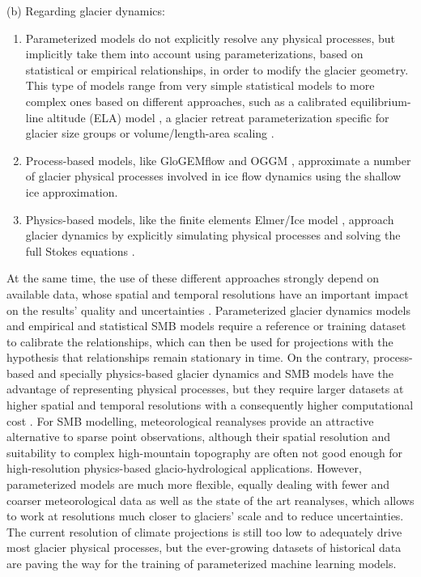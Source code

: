 (b) Regarding glacier dynamics:

\begin{enumerate}
\item Parameterized models do not explicitly resolve any physical processes, but implicitly take them into account using parameterizations, based on statistical or empirical relationships, in order to modify the glacier geometry. This type of models range from very simple statistical models \citep[e.g.][]{carlson_accounting_2014} to more complex ones based on different approaches, such as a calibrated equilibrium-line altitude (ELA) model \citep[e.g.][]{zemp_alpine_2006}, a glacier retreat parameterization specific for glacier size groups \citep{huss_new_2015} or volume/length-area scaling \citep[e.g.][]{marzeion_past_2012, radic_regional_2014}. 
\item Process-based models, like GloGEMflow \citep[e.g.][]{zekollari_modelling_2019} and OGGM \citep[e.g.][]{maussion_open_2019}, approximate a number of glacier physical processes involved in ice flow dynamics using the shallow ice approximation. 
\item Physics-based models, like the finite elements Elmer/Ice model \citep[e.g.][]{gagliardini_capabilities_2013}, approach glacier dynamics by explicitly simulating physical processes and solving the full Stokes equations \citep[e.g.][]{jouvet_numerical_2009, reveillet_simulations_2015}. 
\end{enumerate}

At the same time, the use of these different approaches strongly depend on available data, whose spatial and temporal resolutions have an important impact on the results’ quality and uncertainties \citep[e.g.,][]{reveillet_relative_2018}. Parameterized glacier dynamics models and empirical and statistical SMB models require a reference or training dataset to calibrate the relationships, which can then be used for projections with the hypothesis that relationships remain stationary in time. On the contrary, process-based and specially physics-based glacier dynamics and SMB models have the advantage of representing physical processes, but they require larger datasets at higher spatial and temporal resolutions with a consequently higher computational cost \citep{reveillet_relative_2018}. For SMB modelling, meteorological reanalyses provide an attractive alternative to sparse point observations, although their spatial resolution and suitability to complex high-mountain topography are often not good enough for high-resolution physics-based glacio-hydrological applications. However, parameterized models are much more flexible, equally dealing with fewer and coarser meteorological data as well as the state of the art reanalyses, which allows to work at resolutions much closer to glaciers’ scale and to reduce uncertainties. The current resolution of climate projections is still too low to adequately drive most glacier physical processes, but the ever-growing datasets of historical data are paving the way for the training of parameterized machine learning models. 

